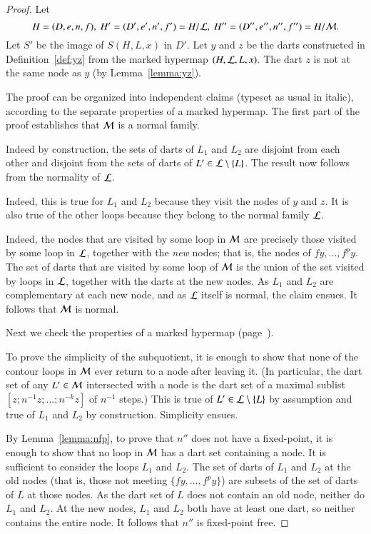 \begin{proof} Let 
\[ 
H=(D,e,n,f),\   H' =(D',e',n',f') = H/{\cal
    L},\  H'' = (D'',e'',n'',f'') = H/{\cal M}.   
\] 
Let $S'$ be the image of $S(H,L,x)$ in $D'$.  Let $y$ and $z$ be the
darts constructed in Definition~\ref{def:yz} from the marked hypermap
$(H,{\cal L},L,x)$.  The dart $z$ is not at the same node as $y$ (by
Lemma~\ref{lemma:yz}).

The proof can be organized into independent claims (typeset as usual
in italic), according to the separate properties of a marked hypermap.
The first part of the proof establishes that ${\cal M}$ is a normal
family.


 
Indeed by construction, the sets of darts of $L_1$ and $L_2$ are
disjoint from each other and disjoint from the sets of darts of $L'\in
{\cal L}\setminus \{L\}$.  The result now follows from the normality
of ${\cal L}$.

   Indeed, this
is true for $L_1$ and $L_2$ because they visit the nodes of $y$ and
$z$.  It is also true of the other loops because they belong to the
normal family ${\cal L}$. 

  
Indeed, the nodes that are visited by some loop in ${\cal M}$ are
precisely those visited by some loop in ${\cal L}$, together with the
{\it new} nodes; that is, the nodes of $f y,\ldots,f^p y$.  The set of
darts that are visited by some loop of ${\cal M}$ is the union of the
set visited by loops in ${\cal L}$, together with the darts at the
new nodes.  As $L_1$ and $L_2$ are complementary at each new node, 
and as ${\cal L}$ itself
is normal, the claim ensues. It follows that ${\cal M}$ is normal.  

Next we check the properties of a marked hypermap (page~\pageref{def:marked}).

 To prove the simplicity of the subquotient, it is enough
to show that none of the contour loops in ${\cal M}$ ever return to a
node after leaving it.  (In particular, the dart set of any
$L'\in{\cal M}$ intersected with a node is the dart set of a maximal
sublist $[z;n^{-1}z;\ldots;n^{-k}z]$ of $n^{-1}$ steps.)  This is true
of $L'\in{\cal L}\setminus\{L\}$ by assumption and true of $L_1$ and
$L_2$ by construction.  Simplicity ensues.

 By Lemma~\ref{lemma:nfp}, to prove that $n''$
does not have a fixed-point, it is enough to show that no loop in
${\cal M}$ has a dart set containing a node.  It is sufficient to
consider the loops $L_1$ and $L_2$.  The set of darts of $L_1$ and
$L_2$ at the old nodes (that is, those not meeting $\{f y,\ldots,f^p
y\}$) are subsets of the set of darts of $L$ at those nodes.  As the
dart set of $L$ does not contain an old node, neither do $L_1$ and
$L_2$.  At the new nodes, $L_1$ and $L_2$ both have at least one dart,
so neither contains the entire node.  It follows that $n''$ is
fixed-point free.


\end{proof}
